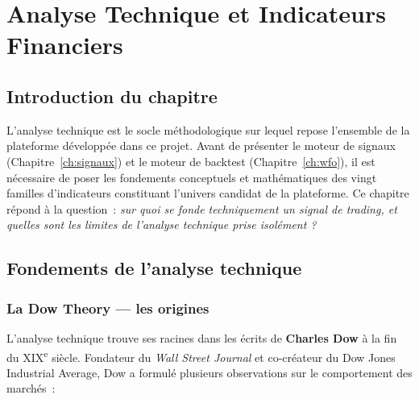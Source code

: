 \chapter{Analyse Technique et Indicateurs Financiers}
\label{ch:at}

\section*{Introduction du chapitre}

L'analyse technique est le socle méthodologique sur lequel repose l'ensemble de la
plateforme développée dans ce projet. Avant de présenter le moteur de signaux
(Chapitre~\ref{ch:signaux}) et le moteur de backtest
(Chapitre~\ref{ch:wfo}), il est nécessaire de poser les fondements conceptuels et
mathématiques des vingt familles d'indicateurs constituant l'univers candidat de la
plateforme. Ce chapitre répond à la question~: \textit{sur quoi se fonde techniquement
un signal de trading, et quelles sont les limites de l'analyse technique prise isolément ?}

\section{Fondements de l'analyse technique}
\label{sec:at_fondements}

\subsection{La Dow Theory — les origines}

L'analyse technique trouve ses racines dans les écrits de \textbf{Charles Dow} à la fin
du XIX\textsuperscript{e} siècle. Fondateur du \textit{Wall Street Journal} et
co-créateur du Dow Jones Industrial Average, Dow a formulé plusieurs observations sur
le comportement des marchés~:

